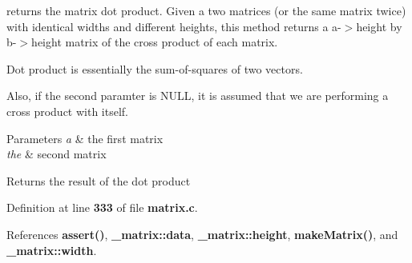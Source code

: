 returns the matrix dot product. Given a two matrices (or the same matrix twice) with identical widths and different heights, this method returns a a-\/$>$height by b-\/$>$height matrix of the cross product of each matrix. 

Dot product is essentially the sum-\/of-\/squares of two vectors.

Also, if the second paramter is N\+U\+LL, it is assumed that we are performing a cross product with itself. 
\begin{DoxyParams}{Parameters}
{\em a} & the first matrix \\
\hline
{\em the} & second matrix \\
\hline
\end{DoxyParams}
\begin{DoxyReturn}{Returns}
the result of the dot product 
\end{DoxyReturn}


Definition at line \textbf{ 333} of file \textbf{ matrix.\+c}.



References \textbf{ assert()}, \textbf{ \+\_\+matrix\+::data}, \textbf{ \+\_\+matrix\+::height}, \textbf{ make\+Matrix()}, and \textbf{ \+\_\+matrix\+::width}.


